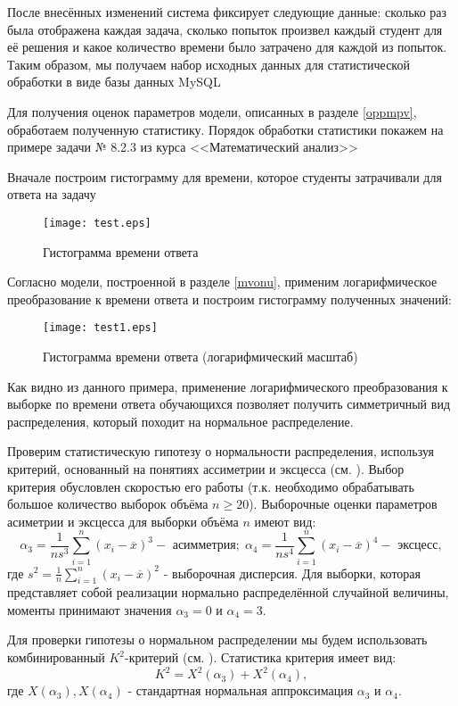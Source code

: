 После внесённых изменений система фиксирует следующие данные: сколь\-ко раз была отображена каждая задача, сколько попыток произвел каждый студент для её решения и какое количество времени было затрачено для каждой из попыток. Таким образом, мы получаем набор исходных данных для статистической обработки в виде базы данных MySQL

Для получения оценок параметров модели, описанных в разделе \ref{oppmpv}, обра\-ботаем полученную статистику. Порядок обработки статистики покажем на примере задачи № 8.2.3 из курса <<Математический анализ>>

Вначале построим гистограмму для времени, которое студенты затра\-чивали для ответа на задачу
\begin{figure}[ht!]
\centering \texttt{[image: test.eps]}
\caption{Гистограмма времени ответа}
\end{figure}


Согласно модели, построенной в разделе \ref{mvonu}, применим логарифми\-ческое преобразование к времени ответа и построим гистограмму полученных значений:
\begin{figure}[ht!]
\centering \texttt{[image: test1.eps]}
\caption{Гистограмма времени ответа (логарифмический масштаб)}
\end{figure}

Как видно из данного примера, применение логарифмического преобра\-зования к выборке по времени ответа обучающихся позволяет получить сим\-метричный вид распределения, который походит на нормальное распреде\-ление. 

Проверим статистическую гипотезу о нормальности распределения, ис\-пользуя критерий, основанный на понятиях ассиметрии и эксцесса (см. \cite{11.,12.}). Выбор критерия обусловлен скоростью его работы (т.к. необходимо обра\-батывать большое количество выборок объёма $n\ge20$). Выборочные оценки параметров асиметрии и эксцесса для выборки объёма $n$ имеют вид:
$$
\alpha_3 = \frac{1}{ns^3}\sum\limits_{i=1}^{n}(x_i-\overline{x})^3 - \mbox{ асимметрия};\; \alpha_4 = \frac{1}{ns^4}\sum\limits_{i=1}^{n}(x_i-\overline{x})^4 - \mbox{ эксцесс},
$$
где $s^2 = \frac{1}{n}\sum\limits_{i=1}^{n}(x_i-\overline{x})^2$ - выборочная дисперсия. Для выборки, которая пред\-ставляет собой реализации нормально распределённой случайной величины, моменты принимают значения $\alpha_3=0$ и $\alpha_4 = 3$.

Для проверки гипотезы о нормальном распределении мы будем исполь\-зовать комбинированный $K^2$-критерий (см. \cite{13.}). Статистика критерия имеет вид:
$$
K^2 = X^2(\alpha_3) + X^2(\alpha_4),
$$
где $X(\alpha_3), X(\alpha_4)$ - стандартная нормальная аппроксимация $\alpha_3$ и $\alpha_4$\cite{37.}.

